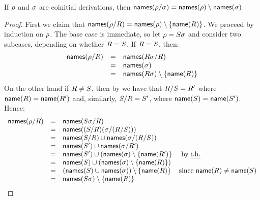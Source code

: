 \begin{lemma}
If $\rho$ and $\sigma$ are coinitial derivations, then
$\mathsf{names}(\rho/\sigma) = \mathsf{names}(\rho) \setminus \mathsf{names}(\sigma)$
\end{lemma}
\begin{proof}
First we claim that $\mathsf{names}(\rho/R) = \mathsf{names}(\rho) \setminus \{\mathsf{name}(R)\}$.
We proceed by induction on $\rho$.
The base case is immediate, so let $\rho = S\sigma$
and consider two subcases, depending on whether $R = S$.
If $R = S$,
then:
\[
  \begin{array}{rcl}
  \mathsf{names}(\rho/R) & = & \mathsf{names}(R\sigma/R) \\
                         & = & \mathsf{names}(\sigma) \\
                         & = & \mathsf{names}(R\sigma) \setminus \{\mathsf{name}(R)\} \\
  \end{array}
\]
On the other hand if $R \neq S$,
then by 
we have that $R/S = R'$
where $\mathsf{name}(R) = \mathsf{name}(R')$
and, similarly,
$S/R = S'$,
where $\mathsf{name}(S) = \mathsf{name}(S')$. Hence:
\[
  \begin{array}{rcll}
  \mathsf{names}(\rho/R) & = & \mathsf{names}(S\sigma/R) \\
                         & = & \mathsf{names}((S/R)(\sigma/(R/S))) \\
                         & = & \mathsf{names}(S/R) \cup \mathsf{names}(\sigma/(R/S)) \\
                         & = & \mathsf{names}(S') \cup \mathsf{names}(\sigma/R') \\
                         & = & \mathsf{names}(S') \cup (\mathsf{names}(\sigma) \setminus \{\mathsf{name}(R')\} & \text{ by {\em i.h.}} \\
                         & = & \mathsf{names}(S) \cup (\mathsf{names}(\sigma) \setminus \{\mathsf{name}(R)\}) \\
                         & = & (\mathsf{names}(S) \cup \mathsf{names}(\sigma)) \setminus \{\mathsf{name}(R)\} & \text{since $\mathsf{name}(R) \neq \mathsf{name}(S)$} \\
                         & = & \mathsf{names}(S\sigma) \setminus \{\mathsf{name}(R)\} \\

\end{array}\]
\end{proof}
